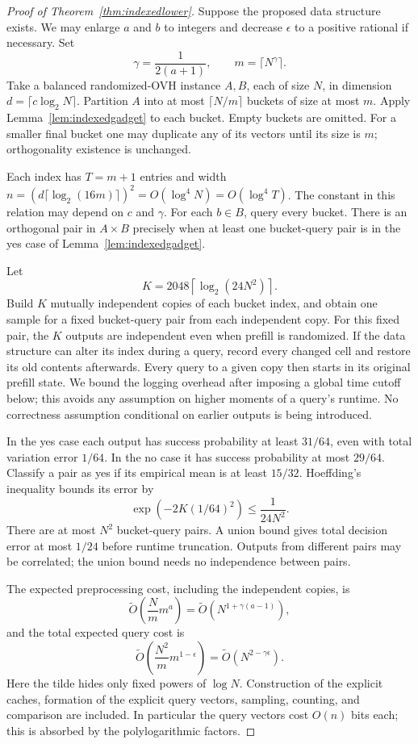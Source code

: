 \begin{proof}[Proof of Theorem~\ref{thm:indexedlower}]
Suppose the proposed data structure exists.  We may enlarge $a$ and
$b$ to integers and decrease $\epsilon$ to a positive rational if
necessary.  Set
\[
 \gamma=\frac1{2(a+1)},\qquad m=\lceil N^\gamma\rceil.
\]
Take a balanced randomized-OVH instance $A,B$, each of size $N$, in
dimension $d=\lceil c\log_2N\rceil$.  Partition $A$ into at most
$\lceil N/m\rceil$ buckets of size at most $m$.  Apply
Lemma~\ref{lem:indexedgadget} to each bucket.  Empty buckets are omitted.
For a smaller final bucket one may duplicate any of its vectors until
its size is $m$; orthogonality existence is unchanged.

Each index has $T=m+1$ entries and width
$n=(d\lceil\log_2(16m)\rceil)^2=O(\log^4N)=O(\log^4T)$.
The constant in this relation may depend on $c$ and $\gamma$.
For each $b\in B$, query every bucket.  There is an orthogonal pair
in $A\times B$ precisely when at least one bucket-query pair is in
the yes case of Lemma~\ref{lem:indexedgadget}.

Let
\[
 K=2048\left\lceil\log_2(24N^2)\right\rceil.
\]
Build $K$ mutually independent copies of each bucket index, and obtain
one sample for a fixed bucket-query pair from each independent copy.
For this fixed pair, the $K$ outputs are independent even when prefill
is randomized.  If the data structure can alter its index during a
query, record every changed cell and restore its old contents afterwards.
Every query to a given copy then starts in its original prefill state.
We bound the logging overhead after imposing a global time cutoff below;
this avoids any assumption on higher moments of a query's runtime.
No correctness assumption conditional on earlier outputs is being
introduced.

In the yes case each output has success probability at least $31/64$,
even with total variation error $1/64$.  In the no case it has success
probability at most $29/64$.  Classify a pair as yes if its empirical
mean is at least $15/32$.  Hoeffding's inequality bounds its error by
\[
 \exp(-2K(1/64)^2)\le\frac1{24N^2}.
\]
There are at most $N^2$ bucket-query pairs.  A union bound gives total
decision error at most $1/24$ before runtime truncation.  Outputs from
different pairs may be correlated; the union bound needs no
independence between pairs.

The expected preprocessing cost, including the independent copies, is
\[
 \widetilde O\left(\frac Nm m^a\right)
 =\widetilde O\left(N^{1+\gamma(a-1)}\right),
\]
and the total expected query cost is
\[
 \widetilde O\left(\frac{N^2}{m}m^{1-\epsilon}\right)
 =\widetilde O\left(N^{2-\gamma\epsilon}\right).
\]
Here the tilde hides only fixed powers of $\log N$.  Construction of
the explicit caches, formation of the explicit query vectors, sampling,
counting, and comparison are included.  In
particular the query vectors cost $O(n)$ bits each; this is absorbed
by the polylogarithmic factors.


\end{proof}
